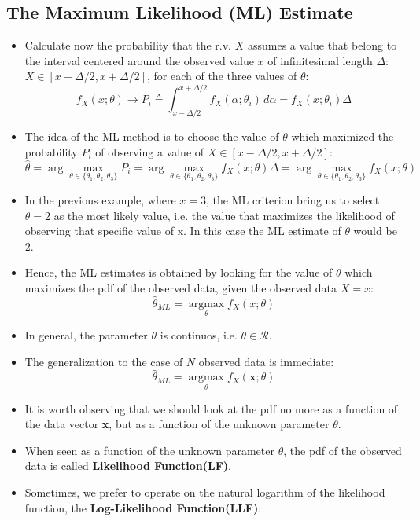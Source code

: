 \subsection{The Maximum Likelihood (ML) Estimate}
\begin{itemize}
    \item Calculate now the probability that the r.v. \(X\) assumes a value that belong to the interval centered around the observed value \(x\) of infinitesimal length \(\Delta\): \(X\in[x-\Delta/2,x+\Delta/2]\), for each of the three values of \(\theta\):
    \[
    f_X(x; \theta) \rightarrow P_{i} \triangleq \int_{x - \Delta/2}^{x + \Delta/2} f_X(\alpha; \theta_{i})\, d\alpha = f_X(x; \theta_{i}) \Delta
    \]
    \item The idea of the ML method is to choose the value of \(\theta\) which maximized the probability \(P_i\) of observing a value of \(X\in[x-\Delta/2,x+\Delta/2]\):
    \[
    \hat{\theta} = \arg\max_{\theta \in \{\theta_1, \theta_2, \theta_3\}} P_i = \arg\max_{\theta \in \{\theta_1, \theta_2, \theta_3\}} f_X(x;\theta) \Delta = \arg\max_{\theta \in \{\theta_1, \theta_2, \theta_3\}} f_X(x;\theta)
    \]
    \item In the previous example, where \(x=3\), the ML criterion bring us to select \(\theta=2\) as the most likely value, i.e. the value that maximizes the likelihood of observing that specific value of x. In this case the ML estimate of \(\theta\) would be 2.
    \item Hence, the ML estimates is obtained by looking for the value of \(\theta\) which maximizes the pdf of the observed data, given the observed data \(X=x\):
    \[
    \hat{\theta}_{ML}=\underset{\theta}{\text{arg}\max} f_X(x;\theta)
    \]
    \item In general, the parameter \(\theta\) is continuos, i.e. \(\theta\in\mathcal{R}\).
    \item The generalization to the case of \(N\) observed data is immediate:
    \[
    \hat{\theta}_{ML}=\underset{\theta}{\text{arg}\max}f_X(\textbf{x};\theta)
    \]
    \item It is worth observing that we should look at the pdf no more as a function of the data vector \textbf{x}, but as a function of the unknown parameter \(\theta\).
    \item When seen as a function of the unknown parameter \(\theta\), the pdf of the observed data is called \textbf{Likelihood Function(LF)}.
    \item Sometimes, we prefer to operate on the natural logarithm of the likelihood function, the \textbf{Log-Likelihood Function(LLF)}:

\end{itemize}
